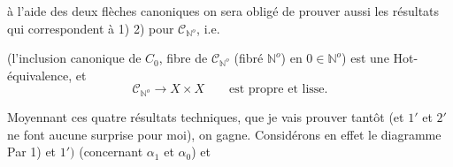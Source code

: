 à l'aide des deux flèches canoniques
on sera obligé de prouver aussi les résultats qui correspondent à 1) 2) pour $\mathcal C_{\mathbb N^o}$, i.e.

(l'inclusion canonique de $C_0$, fibre de $\mathcal C_{\mathbb N^o}$ (fibré  $\mathbb N^o$) en $0\in\mathbb N^o$) est une Hot-équivalence, et
\begingroup\makeatletter\tagsleft@true\makeatother
\[
\mathcal C_{\mathbb N^o}\longrightarrow X\times X\qquad\text{est propre et lisse.}\tag*{$2')$}
\]
\endgroup

Moyennant ces  quatre résultats techniques, que je vais prouver tantôt (et $1'$ et $2'$ ne font aucune surprise pour moi), on gagne. Considérons en effet le diagramme
Par 1) et $1')$ (concernant $\alpha_1$ et $\alpha_0$) et 
